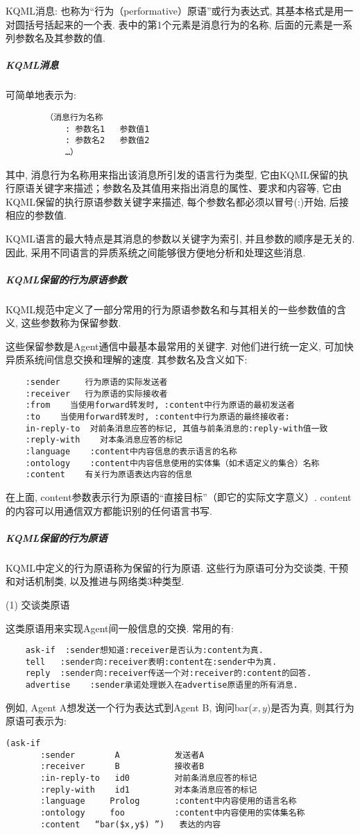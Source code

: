 KQML消息: 也称为“行为（performative）原语”或行为表达式, 其基本格式是用一对圆括号括起来的一个表. 表中的第1个元素是消息行为的名称, 后面的元素是一系列参数名及其参数的值.
\subparagraph{KQML消息}
可简单地表示为:
\begin{Verbatim}
        （消息行为名称
            : 参数名1   参数值1
            : 参数名2   参数值2
            …）
\end{Verbatim}
其中, 消息行为名称用来指出该消息所引发的语言行为类型, 它由KQML保留的执行原语关键字来描述；参数名及其值用来指出消息的属性、要求和内容等, 它由KQML保留的执行原语参数关键字来描述, 每个参数名都必须以冒号(:)开始, 后接相应的参数值.

KQML语言的最大特点是其消息的参数以关键字为索引, 并且参数的顺序是无关的. 因此, 采用不同语言的异质系统之间能够很方便地分析和处理这些消息.
\subparagraph{KQML保留的行为原语参数}
KQML规范中定义了一部分常用的行为原语参数名和与其相关的一些参数值的含义, 这些参数称为保留参数.

这些保留参数是Agent通信中最基本最常用的关键字. 对他们进行统一定义, 可加快异质系统间信息交换和理解的速度. 其参数名及含义如下:
\begin{Verbatim}
    :sender     行为原语的实际发送者
    :receiver   行为原语的实际接收者
    :from    当使用forward转发时, :content中行为原语的最初发送者
    :to    当使用forward转发时, :content中行为原语的最终接收者:
    in-reply-to  对前条消息应答的标记, 其值与前条消息的:reply-with值一致
    :reply-with    对本条消息应答的标记
    :language    :content中内容信息的表示语言的名称
    :ontology    :content中内容信息使用的实体集（如术语定义的集合）名称
    :content    有关行为原语表达内容的信息
\end{Verbatim}

    在上面, content参数表示行为原语的“直接目标”（即它的实际文字意义）. content的内容可以用通信双方都能识别的任何语言书写.
\subparagraph{KQML保留的行为原语}
KQML中定义的行为原语称为保留的行为原语. 这些行为原语可分为交谈类, 干预和对话机制类, 以及推进与网络类3种类型.

(1) 交谈类原语

    这类原语用来实现Agent间一般信息的交换. 常用的有:
\begin{Verbatim}
    ask-if  :sender想知道:receiver是否认为:content为真.
    tell   :sender向:receiver表明:content在:sender中为真.
    reply  :sender向:receiver传送一个对:receiver的:content的回答.
    advertise    :sender承诺处理嵌入在advertise原语里的所有消息.
\end{Verbatim}
例如, Agent A想发送一个行为表达式到Agent B, 询问bar($x,y$)是否为真, 则其行为原语可表示为:
\begin{Verbatim}
(ask-if
       :sender        A           发送者A
       :receiver      B           接收者B
       :in-reply-to   id0         对前条消息应答的标记
       :reply-with    id1         对本条消息应答的标记
       :language     Prolog       :content中内容使用的语言名称
       :ontology     foo          :content中内容使用的实体集名称
       :content   “bar($x,y$) ”)   表达的内容
\end{Verbatim}

